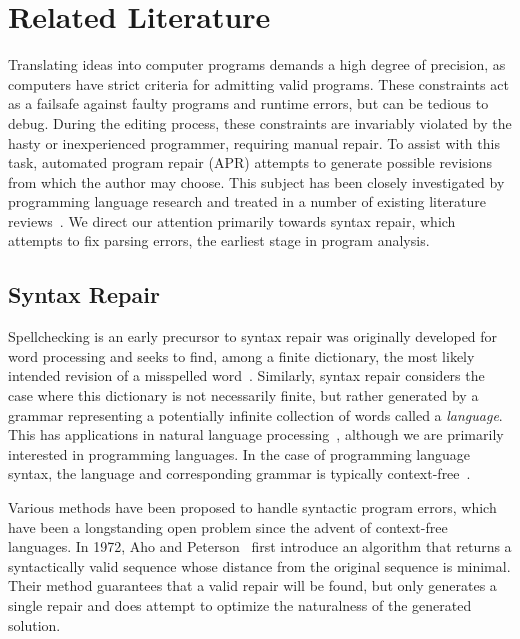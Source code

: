\chapter{\rm\bfseries Related Literature}
\label{ch:litreview}

Translating ideas into computer programs demands a high degree of precision, as computers have strict criteria for admitting valid programs. These constraints act as a failsafe against faulty programs and runtime errors, but can be tedious to debug. During the editing process, these constraints are invariably violated by the hasty or inexperienced programmer, requiring manual repair. To assist with this task, automated program repair (APR) attempts to generate possible revisions from which the author may choose. This subject has been closely investigated by programming language research and treated in a number of existing literature reviews~\cite{monperrus2018living, le2021automatic}. We direct our attention primarily towards syntax repair, which attempts to fix parsing errors, the earliest stage in program analysis.

\section{Syntax Repair}

Spellchecking is an early precursor to syntax repair was originally developed for word processing and seeks to find, among a finite dictionary, the most likely intended revision of a misspelled word~\cite{kernighan1990spelling}. Similarly, syntax repair considers the case where this dictionary is not necessarily finite, but rather generated by a grammar representing a potentially infinite collection of words called a \textit{language}. This has applications in natural language processing~\cite{bryant2023grammatical}, although we are primarily interested in programming languages. In the case of programming language syntax, the language and corresponding grammar is typically context-free~\cite{chomsky1959algebraic}.

Various methods have been proposed to handle syntactic program errors, which have been a longstanding open problem since the advent of context-free languages. In 1972, Aho and Peterson~\cite{aho1972minimum} first introduce an algorithm that returns a syntactically valid sequence whose distance from the original sequence is minimal. Their method guarantees that a valid repair will be found, but only generates a single repair and does attempt to optimize the naturalness of the generated solution.



